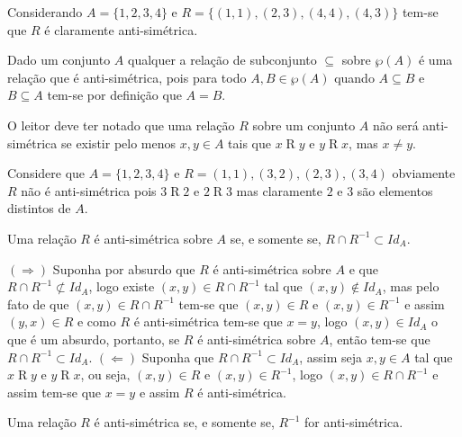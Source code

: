 \begin{exemplo}
	Considerando $A = \{1,2,3,4\}$ e $R = \{(1,1), (2,3), (4,4), (4,3)\}$ tem-se que $R$ é claramente anti-simétrica.
\end{exemplo}

\begin{exemplo}
	Dado um conjunto $A$ qualquer a relação de subconjunto $\subseteq$ sobre $\wp(A)$ é uma relação que é anti-simétrica, pois para todo $A, B \in \wp(A)$ quando $A \subseteq B$ e $B \subseteq A$ tem-se por definição que $A = B$.
\end{exemplo}

O leitor deve ter notado que uma relação $R$ sobre um conjunto $A$ não será anti-simétrica se existir pelo menos $x,y \in A$ tais que $x \mathrel{R} y$ e $y \mathrel{R} x$, mas $x \neq y$. 

\begin{exemplo}
	Considere que $A = \{1,2,3,4\}$ e $R = {(1,1), (3,2), (2,3), (3,4)}$ obviamente $R$ não é anti-simétrica pois $3 \mathrel{R} 2$ e $2 \mathrel{R} 3$ mas claramente $2$ e $3$ são elementos distintos de $A$. 
\end{exemplo}

\begin{teorema}\label{teo:CaracterizacaoRelacaoAntiSimetricas}
	Uma relação $R$ é anti-simétrica sobre $A$ se, e somente se, $R \cap R^{-1} \subset Id_A$.
\end{teorema}

\begin{prova}
	$(\Rightarrow)$ Suponha por absurdo que $R$ é anti-simétrica sobre $A$ e que  $R \cap R^{-1} \not\subset Id_A$, logo existe $(x, y) \in R \cap R^{-1}$ tal que $(x, y) \notin Id_A$, mas pelo fato de que $(x, y) \in R \cap R^{-1}$ tem-se que $(x, y) \in R$ e $(x, y) \in R^{-1}$ e assim $(y, x) \in R$ e como $R$ é anti-simétrica tem-se que $x = y$, logo $(x, y) \in Id_A$ o que é um absurdo, portanto, se $R$ é anti-simétrica sobre $A$, então tem-se que $R \cap R^{-1} \subset Id_A$. $(\Leftarrow)$ Suponha que $R \cap R^{-1} \subset Id_A$, assim seja $x, y \in A$ tal que $x \mathrel{R} y$ e $y \mathrel{R} x$, ou seja, $(x, y) \in R$ e $(x, y) \in R^{-1}$, logo $(x, y) \in R \cap R^{-1}$ e assim tem-se que $x = y$ e assim $R$ é anti-simétrica.
\end{prova}

\begin{corolario}
	Uma relação $R$ é anti-simétrica se, e somente se, $R^{-1}$ for anti-simétrica.
\end{corolario}

